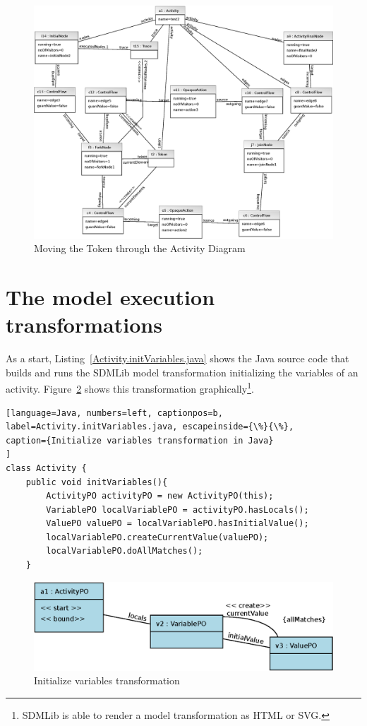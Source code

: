 \documentclass[submission,copyright,creativecommons]{eptcs}
\begin{document}
\begin{figure}[ht] \centering
	\includegraphics[width=\linewidth]{images/ActivityObjectDiagram.eps}
 \caption{Moving the Token through the Activity Diagram}
 \label{fig:ActivityObjectDiagram}
\end{figure}


\section{The model execution transformations}
\label{sec:ModelExecutionTrafos}

As a start, Listing~\ref{Activity.initVariables.java} shows the Java source code 
that builds and runs the SDMLib model transformation initializing the variables
of an activity. Figure~\ref{fig:Activity.initVariables} shows this transformation 
graphically\footnote{SDMLib is able to render a model transformation as HTML or SVG.}. 


\begin{lstlisting}[language=Java, numbers=left, captionpos=b, 
label=Activity.initVariables.java, escapeinside={\%}{\%},
caption={Initialize variables transformation in Java}
]
class Activity {
    public void initVariables(){
        ActivityPO activityPO = new ActivityPO(this);
        VariablePO localVariablePO = activityPO.hasLocals();
        ValuePO valuePO = localVariablePO.hasInitialValue();
        localVariablePO.createCurrentValue(valuePO);
        localVariablePO.doAllMatches();
    }
\end{lstlisting}

\begin{figure}[ht] \centering
	\includegraphics[width=0.8\linewidth]{images/Activity.initVariables.eps}
 \caption{Initialize variables transformation}
 \label{fig:Activity.initVariables}
\end{figure}
\end{document}
